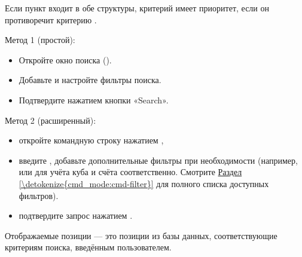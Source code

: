 \documentclass[letterpaper,10pt,russian]{sphinxmanual}
\begin{document}
\sphinxAtStartPar
Если пункт входит в обе структуры, критерий  имеет приоритет, если он противоречит критерию .

\sphinxAtStartPar
Метод 1 (простой):
\begin{itemize}
\item {} 
\sphinxAtStartPar
Откройте окно поиска ().

\item {} 
\sphinxAtStartPar
Добавьте и настройте фильтры поиска.

\item {} 
\sphinxAtStartPar
Подтвердите нажатием кнопки «Search».

\end{itemize}

\sphinxAtStartPar
Метод 2 (расширенный):
\begin{itemize}
\item {} 
\sphinxAtStartPar
откройте командную строку нажатием ,

\item {} 
\sphinxAtStartPar
введите , добавьте дополнительные фильтры при необходимости (например,  или  для учёта куба и счёта соответственно. Смотрите \hyperref[\detokenize{cmd_mode:cmd-filter}]{Раздел \ref{\detokenize{cmd_mode:cmd-filter}}} для полного списка доступных фильтров).

\item {} 
\sphinxAtStartPar
подтвердите запрос нажатием .

\end{itemize}

\sphinxAtStartPar
Отображаемые позиции — это позиции из базы данных, соответствующие критериям поиска, введённым пользователем.
\end{document}
